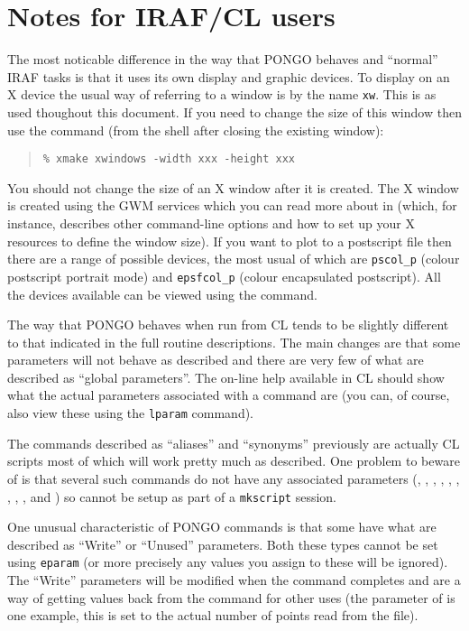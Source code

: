 \section{Notes for IRAF/CL users}

The most noticable difference in the way that PONGO behaves and
``normal'' IRAF tasks is that it uses its own display and graphic
devices. To display on an X device the usual way of referring to a
window is by the name \verb+xw+. This is as used thoughout this
document. If you need to change the size of this window then use the
command (from the shell after closing the existing window):
\begin{quote}
\begin{verbatim}
% xmake xwindows -width xxx -height xxx
\end{verbatim}
\end{quote}
You should not change the size of an X window after it is created. 
The X window is created using the GWM services which you can read 
more about in  (which, for instance, describes
other command-line options and how to set up your X resources to define the
window size). If you want to plot to a postscript file then there are
a range of possible devices, the most usual of which are
\verb+pscol_p+ (colour postscript portrait mode) and \verb+epsfcol_p+ (colour
encapsulated postscript). All the devices available can be viewed
using the  command.

The way that PONGO behaves when run from CL tends to be slightly
different to that indicated in the full routine descriptions. The main
changes are that some parameters will not behave as described and
there are very few of what are described as ``global parameters''. The
on-line help available in CL should show what the actual parameters
associated with a command are (you can, of course, also view these
using the \verb+lparam+ command).

The commands described as ``aliases'' and ``synonyms'' previously are
actually CL scripts most of which will work pretty much as
described. One problem to beware of is that several such commands do
not have any associated parameters (\ie {},
, , , ,
, , , ,
 and ) so cannot be setup as part of a
\verb+mkscript+ session.

One unusual characteristic of PONGO commands is that some have what
are described as ``Write'' or ``Unused'' parameters. Both these types
cannot be set using \verb+eparam+ (or more precisely any values you
assign to these will be ignored). The ``Write'' parameters will be
modified when the command completes and are a way of getting values
back from the command for other uses (the  parameter of
 is one example, this is set to the actual number of
points read from the file).

